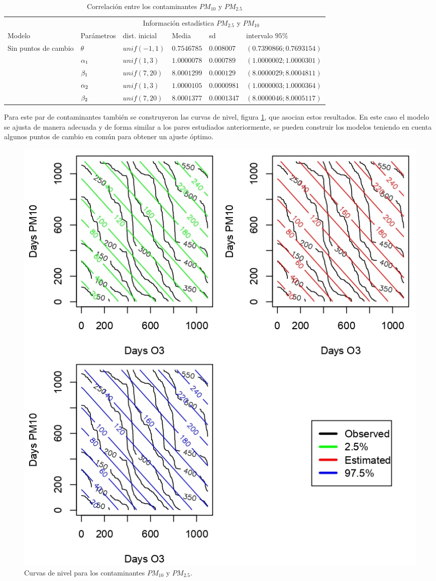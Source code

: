 \begin{table}[!h]
\centering
\begin{tabular}{|l|l|l|l|l|l|}
\hline
& \multicolumn{5}{c|}{Información estadística $PM_{2.5}$ y $PM_{10}$ } \\
\cline{2-6}
Modelo & Parámetros & dist. inicial  & Media & sd  &   intervalo $95 \%$\\
\hline \hline
\multirow{5}{1.5cm}{Sin puntos de cambio }
 & $\theta$ & $unif(-1,1)$ & $0.7546785$ & $0.008007$ & $(0.7390866;0.7693154 )$ \\ \cline{2-6}
& $\alpha_1$& $unif(1,3)$ & $1.0000078$ & $0.000789$ & $(1.0000002; 1.0000301)$\\  \cline{2-6}
& $\beta_1$& $unif(7,20)$ & $8.0001299$ & $0.000129$ & $(8.0000029;8.0004811 )$\\  \cline{2-6}
& $\alpha_2$& $unif(1,3)$ & $1.0000105$ & $0.0000981$ & $(1.0000003; 1.0000364)$\\  \cline{2-6}
& $\beta_2$& $unif(7,20)$ & $8.0001377$ & $0.0001347$ & $(8.0000046;8.0005117)$\\  \cline{1-6}

\end{tabular}
\caption{Correlación entre los contaminantes $PM_{10}$ y $PM_{2.5}$  }
\label{infoestad_PM10_PM2.5}
\end{table}

Para este par de contaminantes también se construyeron las curvas de nivel, figura \ref{curv_niv_pm10_pm25}, que asocian estos resultados. 
En este caso el modelo se ajusta de manera adecuada y de forma similar a los pares estudiados anteriormente, se pueden construir los modelos teniendo en cuenta algunos puntos de cambio en común para obtener un ajuste óptimo. 

\begin{figure}[!h]
\begin{center}
\includegraphics[scale=1]{cdnpm10vspm25}
\end{center}
\centering
\caption{Curvas de nivel para los contaminantes $PM_{10}$ y $PM_{2.5}$. }
\label{curv_niv_pm10_pm25}
\end{figure}